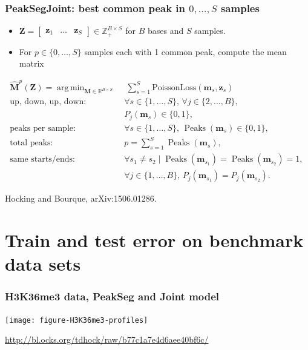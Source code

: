 \documentclass{beamer}
\DeclareMathOperator*{\argmin}{arg\,min}
\DeclareMathOperator*{\Peaks}{Peaks}
\newcommand{\RR}{\mathbb R}
\newcommand{\ZZ}{\mathbb Z}
\begin{document}
\begin{frame}
  \frametitle{PeakSegJoint: best common peak in $0, \dots, S$
    samples}

  \begin{itemize}
  \item $\mathbf Z = \left[
    \begin{array}{ccc}
      \mathbf z_1 & \dots & \mathbf z_S
    \end{array}
  \right]\in\ZZ_+^{B\times S}$ for $B$ bases and $S$ samples.
  \item For $p\in\{0,\dots, S\}$ samples each with 1 common peak,
    compute the mean matrix
  \end{itemize}
\vskip -0.5cm
\begin{align}
  \nonumber \mathbf{\hat M}^p(\mathbf Z)  =
  \argmin_{\mathbf M\in\RR^{B\times S}} &\ \ 
  \sum_{s=1}^S 
  \text{PoissonLoss}(\mathbf m_s, \mathbf z_s) 
  \\
  \text{up, down, up, down:}&\ \nonumber
  \forall s\in\{1, \dots, S\},\,
  \forall j\in\{2, \dots, B\},\\
  &\ P_j(\mathbf m_s) \in\{0, 1\},
  \\
  \text{peaks per sample:} &\ 
  \forall s\in\{1, \dots, S\},\, 
  \Peaks(\mathbf m_s)\in\{0, 1\},  
  \\
  \text{total peaks:}&\ 
  p = \sum_{s=1}^S \Peaks(\mathbf m_s),
  \\
  \text{same starts/ends:} \nonumber &\ \forall s_1\neq s_2\mid
  \Peaks(\mathbf m_{s_1})=\Peaks(\mathbf  m_{s_2})=1,\, \\
   &\ \forall j\in\{1, \dots, B\},\,
  P_j(\mathbf m_{s_1}) = P_j(\mathbf m_{s_2}).
\end{align}

Hocking and Bourque, arXiv:1506.01286.
  
\end{frame}

\section{Train and test error on benchmark data sets}

\begin{frame}
  \frametitle{H3K36me3 data, PeakSeg and Joint model}

  \texttt{[image: figure-H3K36me3-profiles]}

  \url{http://bl.ocks.org/tdhock/raw/b77c1a7e4d6aee40bf6c/}
\end{frame}
\end{document}
